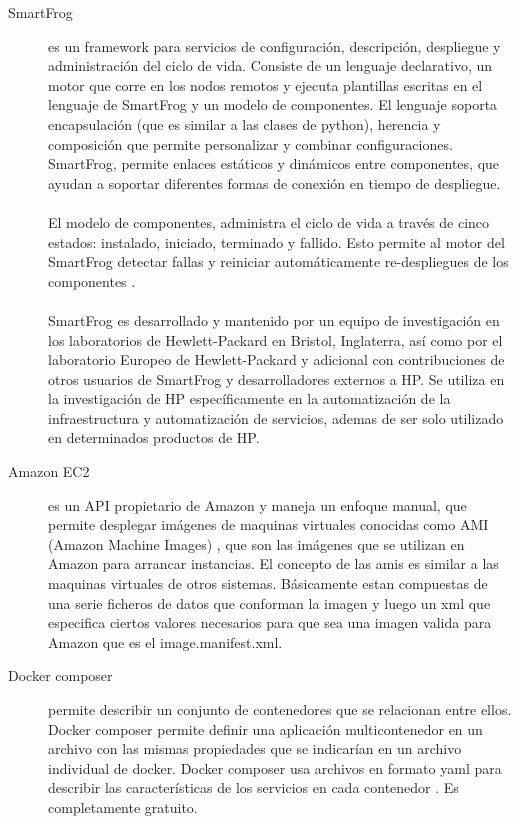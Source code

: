 \begin{description}
\item [SmartFrog]
 es un framework para servicios de configuración, descripción, despliegue y administración del ciclo de vida. Consiste de un lenguaje declarativo, un motor que corre en los nodos remotos y ejecuta plantillas escritas en el lenguaje de SmartFrog y un modelo de componentes. El lenguaje soporta encapsulación (que es similar a las clases de python), herencia y composición que permite personalizar y combinar configuraciones. SmartFrog, permite enlaces estáticos y dinámicos entre componentes, que ayudan a soportar diferentes formas de conexión en tiempo de despliegue.\\
\\
El modelo de componentes, administra el ciclo de vida a través de cinco estados: instalado, iniciado, terminado y fallido. Esto permite al motor del SmartFrog detectar fallas y reiniciar automáticamente re-despliegues de los componentes \cite{Smart09}.\\
\\
SmartFrog es desarrollado y mantenido por un equipo de investigación en los laboratorios de Hewlett-Packard en Bristol, Inglaterra, así como por el laboratorio Europeo de Hewlett-Packard y adicional con contribuciones de otros usuarios de SmartFrog y desarrolladores externos a HP. Se utiliza en la investigación de HP específicamente en la automatización de la infraestructura y automatización de servicios, ademas de ser solo utilizado en determinados productos de HP.

\item [Amazon EC2]
es un API propietario de Amazon y maneja un enfoque manual, que permite desplegar imágenes de maquinas virtuales conocidas como AMI (Amazon Machine Images) \cite{Amazon16}, que son las imágenes que se utilizan en Amazon para arrancar instancias. El concepto de las amis es similar a las maquinas virtuales de otros sistemas. Básicamente estan compuestas de una serie ficheros de datos que conforman la imagen y luego un xml que especifica ciertos valores necesarios para que sea una imagen valida para Amazon que es el image.manifest.xml. 

\item [Docker composer]
permite describir un conjunto de contenedores que se relacionan entre ellos. Docker composer permite definir una aplicación multicontenedor en un archivo con las mismas propiedades que se indicarían en un archivo individual de docker. Docker composer usa archivos en formato yaml para describir las características de los servicios en cada contenedor \cite{doccom16}. Es completamente gratuito. 


\end{description}
